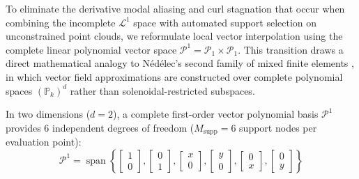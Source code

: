 \documentclass[preprint,12pt]{elsarticle}
\begin{document}
To eliminate the derivative modal aliasing and curl stagnation that occur when combining the incomplete $\mathcal{L}^1$ space with automated support selection on unconstrained point clouds, we reformulate local vector interpolation using the complete linear polynomial vector space $\mathcal{P}^1 = \mathcal{P}_1 \times \mathcal{P}_1$. This transition draws a direct mathematical analogy to Nédélec's second family of mixed finite elements \cite{nedelec1986new}, in which vector field approximations are constructed over complete polynomial spaces $(\mathbb{P}_k)^d$ rather than solenoidal-restricted subspaces.

In two dimensions ($d=2$), a complete first-order vector polynomial basis $\mathcal{P}^1$ provides 6 independent degrees of freedom ($M_{\mathrm{supp}} = 6$ support nodes per evaluation point):
\begin{equation}
    \mathcal{P}^1 = \operatorname{span} \left\{
    \begin{bmatrix} 1 \\ 0 \end{bmatrix},
    \begin{bmatrix} 0 \\ 1 \end{bmatrix},
    \begin{bmatrix} x \\ 0 \end{bmatrix},
    \begin{bmatrix} y \\ 0 \end{bmatrix},
    \begin{bmatrix} 0 \\ x \end{bmatrix},
    \begin{bmatrix} 0 \\ y \end{bmatrix}
    \right\}
    \label{eq:complete_P1_basis_vectors}
\end{equation}
\end{document}
